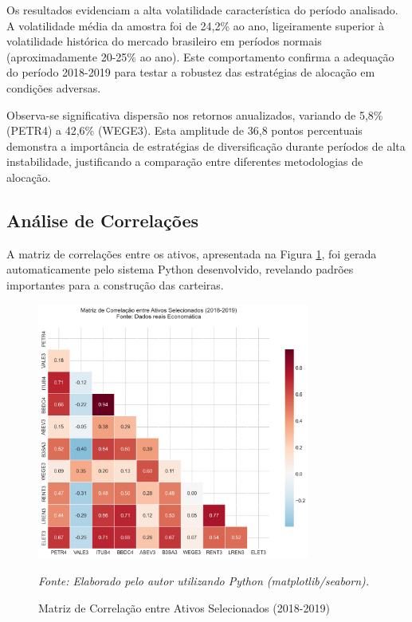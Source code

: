 Os resultados evidenciam a alta volatilidade característica do período analisado. A volatilidade média da amostra foi de 24,2\% ao ano, ligeiramente superior à volatilidade histórica do mercado brasileiro em períodos normais (aproximadamente 20-25\% ao ano). Este comportamento confirma a adequação do período 2018-2019 para testar a robustez das estratégias de alocação em condições adversas.

Observa-se significativa dispersão nos retornos anualizados, variando de 5,8\% (PETR4) a 42,6\% (WEGE3). Esta amplitude de 36,8 pontos percentuais demonstra a importância de estratégias de diversificação durante períodos de alta instabilidade, justificando a comparação entre diferentes metodologias de alocação.

\subsection{Análise de Correlações}

A matriz de correlações entre os ativos, apresentada na Figura \ref{fig:correlation_matrix}, foi gerada automaticamente pelo sistema Python desenvolvido, revelando padrões importantes para a construção das carteiras.

\begin{figure}[H]
\centering
\includegraphics[width=0.8\textwidth]{images/correlation_matrix.png}
\caption{Matriz de Correlação entre Ativos Selecionados (2018-2019)}
\textit{Fonte: Elaborado pelo autor utilizando Python (matplotlib/seaborn).}
\label{fig:correlation_matrix}
\end{figure}

